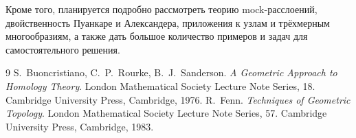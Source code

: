 \documentclass[12pt, twoside]{article}
\begin{document}
Кроме того, планируется подробно рассмотреть теорию mock-расслоений, двойственность Пуанкаре и Александера, приложения к узлам и трёхмерным многообразиям, а также дать большое количество примеров и задач для самостоятельного решения.

\begin{thebibliography}{9}
 S.~Buoncristiano, C.~P.~Rourke, B.~J.~Sanderson.
\textit{A Geometric Approach to Homology Theory}.
London Mathematical Society Lecture Note Series, 18.
Cambridge University Press, Cambridge, 1976.
 R.~Fenn.
\textit{Techniques of Geometric Topology}.
London Mathematical Society Lecture Note Series, 57.
Cambridge University Press, Cambridge, 1983.
\end{thebibliography}
\end{document}
